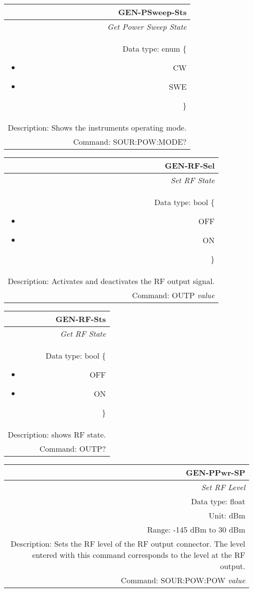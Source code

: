 \documentclass[openany]{article}
\begin{document}
		\begin{tabular}{N}
			\hline
			\bfseries GEN-PSweep-Sts \\ \hline
			\emph{Get Power Sweep State} \\
			Data type: enum \{\begin{itemize}[noitemsep]
				\small
				\item[] CW
				\item[] SWE
			\end{itemize}\} \\
			Description: Shows the instruments operating mode.\\
			Command: SOUR:POW:MODE? \\

		\end{tabular}
%
		\begin{tabular}{N}
			\hline
			\bfseries GEN-RF-Sel \\ \hline
			\emph{Set RF State} \\
			Data type: bool \{\begin{itemize}[noitemsep]
				\small
				\item[] OFF
				\item[] ON
			\end{itemize}\} \\
			Description: Activates and deactivates the RF output signal. \\
			Command: OUTP \emph{value} \\

		\end{tabular}


		\begin{tabular}{N}
			\hline
			\bfseries GEN-RF-Sts \\ \hline
			\emph{Get RF State} \\
			Data type: bool \{\begin{itemize}[noitemsep]
				\small
				\item[] OFF
				\item[] ON
			\end{itemize}\} \\
			Description: shows RF state. \\
			Command: OUTP? \\

		\end{tabular}
%
		\begin{tabular}{N}
			\hline
			\bfseries GEN-PPwr-SP \\ \hline
			\emph{Set RF Level} \\
			Data type: float \\
			Unit: dBm \\
			Range: -145 dBm to 30 dBm \\
			Description: Sets the RF level of the RF output connector. The level entered with this command corresponds to the level at the RF output. \\
			Command: SOUR:POW:POW \emph{value} \\

		\end{tabular}
\end{document}
